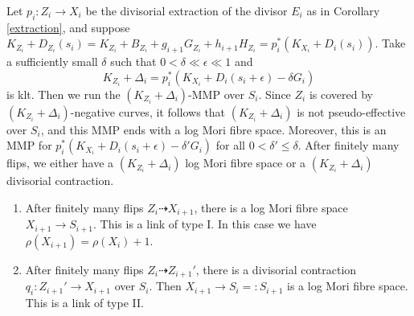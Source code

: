 \begin{enumerate}
  Let $p_{i}:Z_{i}\to X_{i}$ be the divisorial extraction of the divisor $E_{i}$ as in Corollary \ref{extraction}, and suppose $K_{Z_{i}}+D_{Z_{i}}(s_{i})=K_{Z_{i}}+B_{Z_{i}}+g_{i+1}G_{Z_{i}}+h_{i+1}H_{Z_{i}}=p_{i}^*\left(K_{X_{i}}+D_{i}\left(s_{i}\right)\right)$.
  Take a sufficiently small $\delta$ such that $0<\delta \ll \epsilon \ll 1$ and
  \[
    K_{Z_{i}}+\Delta_{i}=p_{i}^*(K_{X_{i}}+D_{i}(s_{i}+\epsilon)-\delta G_{i})
  \]
  is klt. Then we run the $(K_{Z_{i}}+\Delta_{i})$-MMP  over $S_{i}$. Since $Z_{i}$ is covered by $(K_{Z_{i}}+\Delta_{i})$-negative curves, it follows that $(K_{Z_{i}}+\Delta_{i})$ is not pseudo-effective over $S_{i}$, and this MMP ends with a log Mori fibre space. Moreover, this is an MMP for $p_{i}^*(K_{X_{i}}+D_{i}(s_{i}+\epsilon)-\delta'G_{i})$ for all $0<\delta'\leqslant\delta$. After finitely many flips, we either have a $(K_{Z_{i}}+\Delta_{i})$ log Mori fibre space or a $(K_{Z_{i}}+\Delta_{i})$ divisorial contraction.
  \begin{enumerate}
    \item\label{2b1} After finitely many flips $Z_{i}\dashrightarrow X_{i+1}$, there is a log Mori fibre space $X_{i+1}\to S_{i+1}$. This is a link of type I. In this case we have $\rho(X_{i+1})=\rho(X_{i})+1$.
    \item\label{2b2} After finitely many flips $Z_{i}\dashrightarrow Z_{i+1}'$, there is a divisorial contraction $q_{i}:Z_{i+1}'\to X_{i+1}$ over $S_i$. Then $X_{i+1}\to S_{i}=:S_{i+1}$ is a log Mori fibre space. This is a link of type II.
  \end{enumerate}
\end{enumerate}
